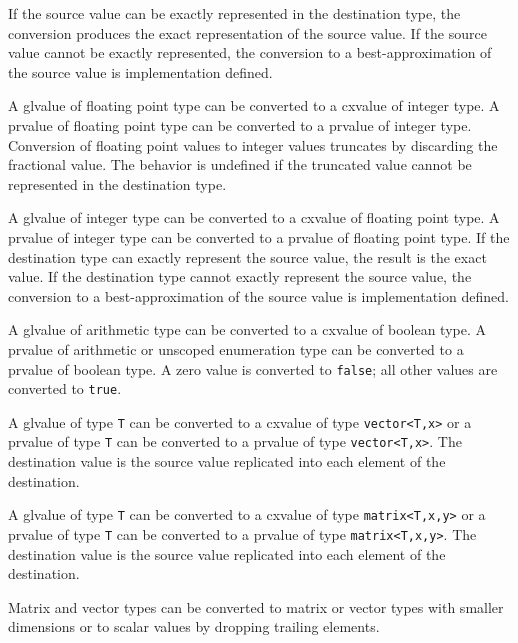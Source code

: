\p If the source value can be exactly represented in the destination type, the
conversion produces the exact representation of the source value. If the source
value cannot be exactly represented, the conversion to a best-approximation of
the source value is implementation defined.


\p A glvalue of floating point type can be converted to a cxvalue of integer
type. A prvalue of floating point type can be converted to a prvalue of
integer type. Conversion of floating point values to integer values truncates by
discarding the fractional value. The behavior is undefined if the truncated
value cannot be represented in the destination type.

\p A glvalue of integer type can be converted to a cxvalue of floating point
type. A prvalue of integer type can be converted to a prvalue of floating
point type. If the destination type can exactly represent the source value, the
result is the exact value. If the destination type cannot exactly represent the
source value, the conversion to a best-approximation of the source value is
implementation defined.


\p A glvalue of arithmetic type can be converted to a cxvalue of boolean type. A
prvalue of arithmetic or unscoped enumeration type can be converted to a prvalue
of boolean type. A zero value is converted to \texttt{false}; all other values
are converted to \texttt{true}.


\p A glvalue of type \texttt{T} can be converted to a cxvalue of type
\texttt{vector<T,x>} or a prvalue of type \texttt{T} can be converted to a
prvalue of type \texttt{vector<T,x>}. The destination value is the source value
replicated into each element of the destination.

\p A glvalue of type \texttt{T} can be converted to a cxvalue of type
\texttt{matrix<T,x,y>} or a prvalue of type \texttt{T} can be converted to a
prvalue of type \texttt{matrix<T,x,y>}. The destination value is the source
value replicated into each element of the destination.


\p Matrix and vector types can be converted to matrix or vector types with
smaller dimensions or to scalar values by dropping trailing elements.

